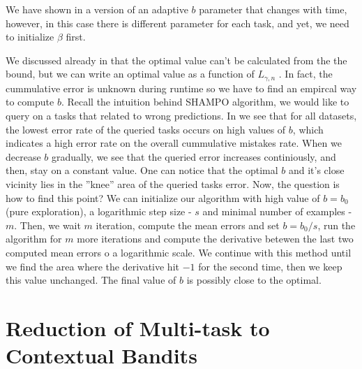 We have shown in  a version of an adaptive $b$ parameter that changes 
with time, however, in this case there is different parameter for each task, and
yet, we need to initialize $\beta$ first. 

We discussed already in  that the optimal value can't be calculated from the the 
bound, but we can write an optimal value as a function of  $L_{\gamma,n}$ . 
In fact, the cummulative error is unknown during runtime so we have to find an 
empircal way to compute $b$.  Recall the intuition behind SHAMPO algorithm, we 
would like to query on a tasks that related to wrong predictions.
In  we see that for all datasets, the lowest error rate of the queried tasks 
occurs on high values of $b$, which indicates a high error rate on the overall cummulative mistakes 
rate. When we decrease $b$ gradually, we see that the queried error increases 
continiously, and then, stay on a constant value. One can notice 
that the optimal $b$ and it's close vicinity lies in the ''knee''  area of the  queried tasks 
error. Now, the question is how to find this point?
We can initialize our algorithm with high value of $b = b_0$ (pure exploration), a logarithmic step size - $s$ and 
minimal number of examples -  $m$. Then, we wait $m$ iteration, compute 
the mean errors and set $b = b_0/s$,  run the algorithm for $m$ more 
iterations and compute the derivative betewen the last two computed mean errors o  a logarithmic scale. We 
continue with this method  until we find the area where the derivative hit 
$-1$ for the second time, then we keep this value unchanged. The final value of $b$ 
is possibly close to the optimal.


\section{Reduction of Multi-task to Contextual Bandits}


